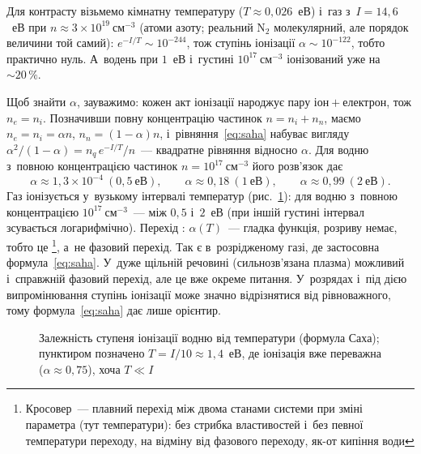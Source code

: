 \begin{Estimate}
Для контрасту візьмемо кімнатну температуру ($T\approx0{,}026$~еВ) і~газ з~$I=14{,}6$~еВ при $n\approx3\times10^{19}~\mathrm{см}^{-3}$
(атоми азоту; реальний $\mathrm N_2$ молекулярний, але порядок величини той самий): $e^{-I/T}\sim10^{-244}$, тож
ступінь іонізації $\alpha\sim10^{-122}$, тобто практично нуль. А~водень при $1$~еВ і~густині $10^{17}~\mathrm{см}^{-3}$ іонізований уже на~$\sim20\,\%$.
\end{Estimate}
Щоб знайти $\alpha$, зауважимо: кожен акт іонізації народжує пару іон${}+{}$електрон, тож $n_e=n_i$.
Позначивши повну концентрацію частинок $n=n_i+n_n$, маємо $n_e=n_i=\alpha n$, $n_n=(1-\alpha)n$, і~рівняння~\eqref{eq:saha}
набуває вигляду $\alpha^2/(1-\alpha)=n_q\,e^{-I/T}/n$~--- квадратне рівняння відносно $\alpha$.
Для водню з~повною концентрацією частинок $n=10^{17}~\mathrm{см}^{-3}$
його розв'язок дає
\begin{equation*}
	\alpha\approx1{,}3\times10^{-4}\ (0{,}5~\text{еВ}),\qquad
	\alpha\approx0{,}18\ (1~\text{еВ}),\qquad
	\alpha\approx0{,}99\ (2~\text{еВ}).
\end{equation*}
Газ іонізується у~вузькому інтервалі температур (рис.~\ref{tikz:saha-curve}): для водню
з~повною концентрацією $10^{17}~\mathrm{см}^{-3}$~--- між $0{,}5$ і~$2$~еВ (при іншій
густині інтервал зсувається логарифмічно). Перехід : $\alpha(T)$~--- гладка
функція, розриву немає, тобто це \footnote{Кросовер~--- плавний перехід між двома станами системи при зміні параметра
(тут температури): без стрибка властивостей і~без певної температури переходу, на відміну від фазового переходу,
як-от кипіння води}, а~не фазовий перехід. Так є в~розрідженому газі, де застосовна формула~\eqref{eq:saha}. У~дуже щільній
речовині (сильнозв'язана плазма) можливий і~справжній фазовий перехід, але це вже окреме
питання. У~розрядах і~під дією випромінювання ступінь іонізації може значно відрізнятися
від рівноважного, тому формула~\eqref{eq:saha} дає лише орієнтир.

\begin{figure}[ht]\centering
{}
\caption{Залежність ступеня іонізації водню від температури (формула Саха); пунктиром позначено $T=I/10\approx1{,}4$~еВ,
де іонізація вже переважна ($\alpha\approx0{,}75$), хоча $T\ll I$}
\label{tikz:saha-curve}
\end{figure}


